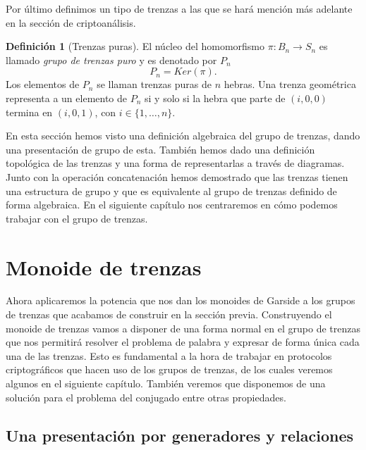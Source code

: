 \documentclass[12pt]{book}
\theoremstyle{definition}
\newtheorem{defi}{Definición}[section]
\begin{document}
Por último definimos un tipo de trenzas a las que se hará mención más adelante en la sección de criptoanálisis.
\begin{defi}[Trenzas puras]
El núcleo del homomorfismo $\pi:B_n\rightarrow S_n$ es llamado \textit{grupo de trenzas puro} y es denotado por $P_n$
$$P_n = Ker(\pi).$$
Los elementos de $P_n$ se llaman trenzas puras de $n$ hebras. Una trenza geométrica representa a un elemento de $P_n$ si y solo si la hebra que parte de $(i,0,0)$ termina en $(i,0,1)$, con $i \in\{ 1,\ldots,n\}$.

\end{defi}

En esta sección hemos visto una definición algebraica del grupo de trenzas, dando una presentación de grupo de esta. También hemos dado una definición topológica de las trenzas y una forma de representarlas a través de diagramas. Junto con la operación concatenación hemos demostrado que las trenzas tienen una estructura de grupo y que es equivalente al grupo de trenzas definido de forma algebraica. En el siguiente capítulo nos centraremos en cómo podemos trabajar con el grupo de trenzas.



















\chapter{Monoide de trenzas}

Ahora aplicaremos la potencia que nos dan los monoides de Garside a los grupos de trenzas que acabamos de construir en la sección previa. Construyendo el monoide de trenzas vamos a disponer de una forma normal en el grupo de trenzas que nos permitirá resolver el problema de palabra y expresar de forma única cada una de las trenzas. Esto es fundamental a la hora de trabajar en protocolos criptográficos que hacen uso de los grupos de trenzas, de los cuales veremos algunos en el siguiente capítulo. También veremos que disponemos de una solución para el problema del conjugado entre otras propiedades.
\section{Una presentación por generadores y relaciones}
\end{document}
